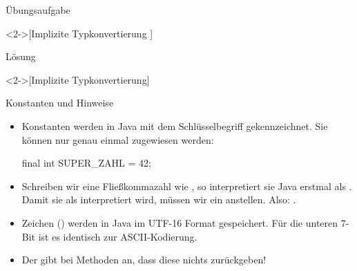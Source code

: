 \ifull
\begin{frame}[c,fragile]{Übungsaufgabe}
    \begin{exercise}<2->[Implizite Typkonvertierung ]
    \end{exercise}
\end{frame}

\begin{frame}[c,fragile]{Lösung}
    \begin{solve}<2->[Implizite Typkonvertierung]
    \end{solve}
\end{frame}
\fi

\begin{frame}[fragile]{Konstanten und Hinweise}
    \begin{itemize}[<+(1)->]
        \widei
        \item Konstanten werden in Java mit dem Schlüsselbegriff  gekennzeichnet. Sie können nur genau einmal zugewiesen werden: \begin{plainjava}
final int SUPER_ZAHL = 42;
        \end{plainjava}
        \item Schreiben wir eine Fließkommazahl wie , so interpretiert sie Java erstmal als .\pause{} Damit sie als  interpretiert wird, müssen wir ein  anstellen.\pause{} Also: .
        \item Zeichen () werden in Java im UTF-16 Format gespeichert.\pause{} Für die unteren \(7\)-Bit ist es identisch zur ASCII-Kodierung.
        \item Der   gibt bei Methoden an,\pause{} dass diese nichts zurückgeben!
    \end{itemize}
\end{frame}

